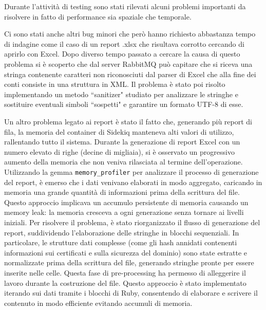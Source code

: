\documentclass[target=bach,aauheader=,style=]{thud}
\begin{document}
Durante l'attività di testing sono stati rilevati alcuni problemi importanti da risolvere in fatto di performance sia spaziale che temporale.

Ci sono stati anche altri bug minori che però hanno richiesto abbastanza tempo di indagine come il caso di un report .xlsx che risultava corrotto cercando di aprirlo con Excel. Dopo diverso tempo
passato a cercare la causa di questo problema si è scoperto che dal server RabbitMQ può capitare che si riceva una stringa contenente caratteri non riconosciuti dal parser di Excel che alla fine dei
conti consiste in una struttura in XML. Il problema è stato poi risolto implementando un metodo ``sanitizer" studiato per analizzare le stringhe e sostituire eventuali simboli ``sospetti" e garantire
un formato UTF-8 di esse.

Un altro problema legato ai report è stato il fatto che, generando più report di fila, la memoria del container di Sidekiq manteneva alti valori di utilizzo, rallentando tutto il sistema.
Durante la generazione di report Excel con un numero elevato di righe (decine di migliaia), si è osservato un progressivo aumento della memoria che non veniva rilasciata al termine dell'operazione.
Utilizzando la gemma \texttt{memory\_profiler} \cite{memory_profiler_gem} per analizzare il processo di generazione del report, è emerso che i dati venivano elaborati in modo aggregato, caricando in
memoria una grande quantità di informazioni prima della scrittura del file. Questo approccio implicava un accumulo persistente di memoria causando un memory leak: la memoria cresceva
a ogni generazione senza tornare ai livelli iniziali. Per risolvere il problema, è stato riorganizzato il flusso di generazione del report, suddividendo l'elaborazione delle stringhe in blocchi
sequenziali. In particolare, le strutture dati complesse (come gli hash annidati contenenti informazioni sui certificati e sulla sicurezza del dominio) sono state estratte e normalizzate prima
della scrittura del file, generando stringhe pronte per essere inserite nelle celle. Questa fase di pre-processing ha permesso di alleggerire il lavoro durante la costruzione del file.
Questo approccio è stato implementato iterando sui dati tramite i blocchi di Ruby, consentendo di elaborare e scrivere il contenuto in modo efficiente evitando accumuli di memoria.
\end{document}
